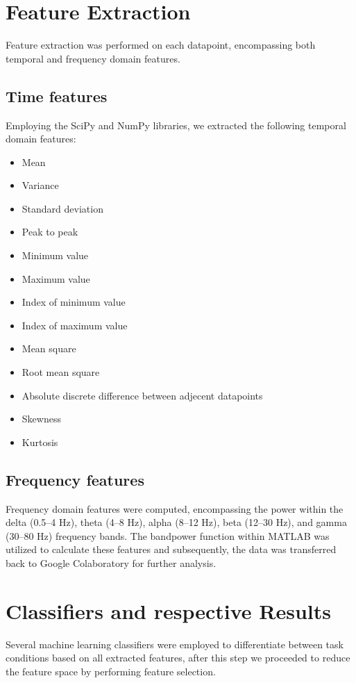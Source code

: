 \documentclass[conference]{IEEEtran}
\begin{document}
\vspace{2mm}
\section{Feature Extraction}
\vspace{2mm}

Feature extraction was performed on each datapoint, encompassing both temporal and frequency domain features.

\subsection{Time features}
\label{AA}

Employing the SciPy and NumPy libraries, we extracted the following temporal domain features:
\begin{itemize}
    \item Mean
    \item Variance
    \item Standard deviation
    \item Peak to peak
    \item Minimum value
    \item Maximum value
    \item Index of minimum value
    \item Index of maximum value
    \item Mean square
    \item Root mean square
    \item Absolute discrete difference between adjecent datapoints
    \item Skewness
    \item Kurtosis
\end{itemize}

\subsection{Frequency features} \label{subsec:Ff}

Frequency domain features were computed, encompassing the power within the delta (0.5–4 Hz), theta (4–8 Hz), alpha (8–12 Hz), beta (12–30 Hz), and gamma (30–80 Hz) frequency bands. The bandpower function within MATLAB was utilized to calculate these features and subsequently, the data was transferred back to Google Colaboratory for further analysis.
\vspace{2mm}
\section{Classifiers and respective Results}
\vspace{2mm}
Several machine learning classifiers were employed to differentiate between task conditions based on all extracted features, after this step we proceeded to reduce the feature space by performing feature selection.
\end{document}
